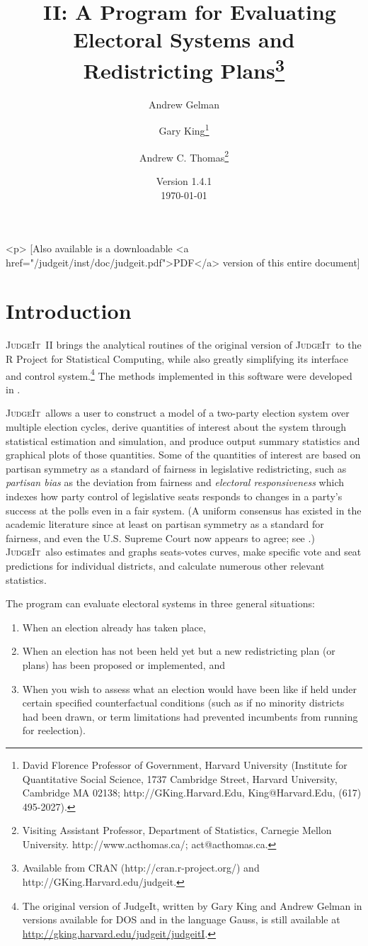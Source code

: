 \documentclass[oneside,letterpaper,titlepage]{article}
\title{\JudgeIt~II: A Program for Evaluating Electoral Systems and
  Redistricting Plans\thanks{Available from CRAN (http://cran.r-project.org/) and
    http://GKing.Harvard.edu/judgeit.}}
\author{Andrew Gelman \and Gary King\thanks{David Florence Professor
    of Government, Harvard University (Institute for Quantitative
    Social Science, 1737 Cambridge Street, Harvard University,
    Cambridge MA 02138; http://GKing.Harvard.Edu, King@Harvard.Edu,
    (617) 495-2027).}  \and %
	Andrew C. Thomas\thanks{Visiting Assistant Professor, Department of Statistics, Carnegie Mellon University. http://www.acthomas.ca/; act@acthomas.ca.}}
\date{Version 1.4.1\\ \today}
\newcommand{\JudgeIt}{\textsc{JudgeIt}\ }
\begin{document}
\maketitle

\begin{rawhtml}
  <p> [Also available is a downloadable <a
  href="/judgeit/inst/doc/judgeit.pdf">PDF</a> version of this entire document]
\end{rawhtml}

\tableofcontents
\clearpage

\section{Introduction}

\JudgeIt II brings the analytical routines of the original version of \JudgeIt to the R Project for Statistical Computing, while also greatly simplifying its interface and control system.\footnote{The original version of JudgeIt, written by Gary King and Andrew Gelman in   versions available for DOS and in the language Gauss, is still available at \url{http://gking.harvard.edu/judgeit/judgeitI}.}  The methods implemented in this software were developed in \citet{GelKin90,GelKin90b,GelKin94a,GelKin94b,KinGel91,GelKatKin04}.

\JudgeIt allows a user to construct a model of a two-party election system over multiple election cycles, derive quantities of interest about the system through statistical estimation and simulation, and produce output summary statistics and graphical plots of those quantities.  Some of the quantities of interest are based on partisan symmetry as a standard of fairness in legislative redistricting, such as \emph{partisan bias} as the deviation from fairness and \emph{electoral responsiveness} which indexes how party control of legislative seats responds to changes in a party's success at the polls even in a fair system.  (A uniform consensus has existed in the academic literature since at least \citet{KinBro87} on partisan symmetry as a standard for fairness, and even the U.S. Supreme Court now appears to agree; see \citealt{GroKin07}.)  \JudgeIt also estimates and graphs seats-votes curves, make specific vote and seat predictions for individual districts, and calculate numerous other relevant statistics.

The program can evaluate electoral systems in three general situations:
\begin{enumerate}
\item When an election already has taken place,
\item When an election has not been held yet but a new redistricting plan (or plans) has been proposed or implemented, and
\item When you wish to assess what an election would have been like if held under certain specified counterfactual conditions (such as if no minority districts had been drawn, or term limitations had prevented incumbents from running for reelection).
\end{enumerate}
\end{document}
